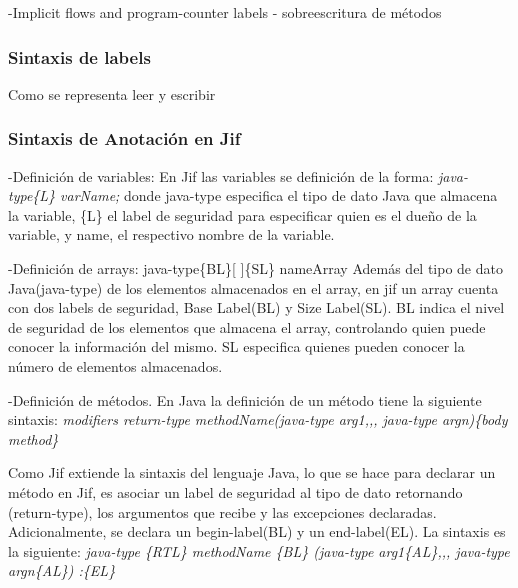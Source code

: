 -Implicit flows and program-counter labels\newline
- sobreescritura de métodos

\subsubsection{Sintaxis de labels}
Como se representa leer y escribir

\subsubsection{Sintaxis de Anotación en Jif}
\label{subsec:JifSintax}

-Definición de variables: \newline 
En Jif las variables se definición de la forma: 
\emph{ java-type\{L\} varName; }\newline 
donde java-type especifica el tipo de dato Java que
almacena la variable, \{L\} el label de seguridad  para especificar quien es el
dueño de la variable, y name, el respectivo nombre de la variable.

-Definición de arrays:\newline
java-type\{BL\}[ ]\{SL\} nameArray\newline
Además del tipo de dato Java(java-type) de los elementos almacenados en el
array,  en jif un array cuenta con dos labels de seguridad, Base Label(BL) y
Size Label(SL). BL indica el nivel de seguridad de los elementos que almacena el
array, controlando quien puede conocer la información del mismo. SL especifica
quienes pueden conocer la número de elementos almacenados.

-Definición de métodos.\newline
En Java la definición de un método tiene la siguiente sintaxis:\newline
\emph{modifiers return-type methodName(java-type arg1,,, java-type
argn)\{body method\}}

Como Jif extiende la sintaxis del lenguaje Java, lo que se hace para
declarar un método en Jif, es asociar un label de seguridad al tipo de dato
retornando (return-type), los argumentos que recibe y las excepciones
declaradas. Adicionalmente, se declara un begin-label(BL) y un end-label(EL). La
sintaxis es la siguiente:\newline
\emph{ java-type \{RTL\} methodName \{BL\} (java-type arg1\{AL\},,,
java-type argn\{AL\}) :\{EL\} }

